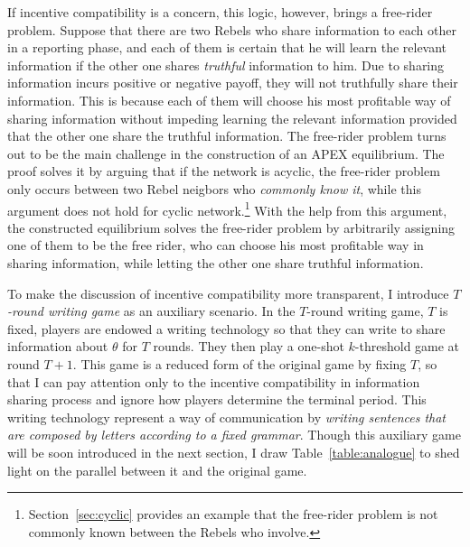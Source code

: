 \documentclass[12pt,letter]{article}
\theoremstyle{definition}
\theoremstyle{remark}
\theoremstyle{claim}
\begin{document}
If incentive compatibility is a concern, this logic, however, brings a free-rider problem. Suppose that there are two Rebels who share information to each other in a reporting phase, and each of them is certain that he will learn the relevant information if the other one shares \textit{truthful} information to him. Due to sharing information incurs positive or negative payoff, they will not truthfully share their information. This is because each of them will choose his most profitable way of sharing information without impeding learning the relevant information provided that the other one share the truthful information. The free-rider problem turns out to be the main challenge in the construction of an APEX equilibrium. The proof solves it by arguing that if the network is acyclic, the free-rider problem only occurs between two Rebel neigbors who \textit{commonly know it}, while this argument does not hold for cyclic network.\footnote{Section~\ref{sec:cyclic} provides an example that the free-rider problem is not commonly known between the Rebels who involve.} 
With the help from this argument, the constructed equilibrium solves the free-rider problem by arbitrarily assigning one of them to be the {free rider}, who can choose his most profitable way in sharing information, while letting the other one share truthful information. 

To make the discussion of incentive compatibility more transparent, I introduce \textit{$T$-round writing game} as an auxiliary scenario. In the $T$-round writing game, $T$ is fixed, players are endowed a writing technology so that they can write to share information about $\theta$ for $T$ rounds. They then play a one-shot $k$-threshold game at round $T+1$. This game is a reduced form of the original game by fixing $T$, so that I can pay attention only to the incentive compatibility in information sharing process and ignore how players determine the terminal period. This writing technology represent a way of communication by \textit{writing sentences that are composed by letters according to a fixed grammar}. Though this auxiliary game will be soon introduced in the next section, I draw Table~\ref{table:analogue} to shed light on the parallel between it and the original game.
\end{document}

